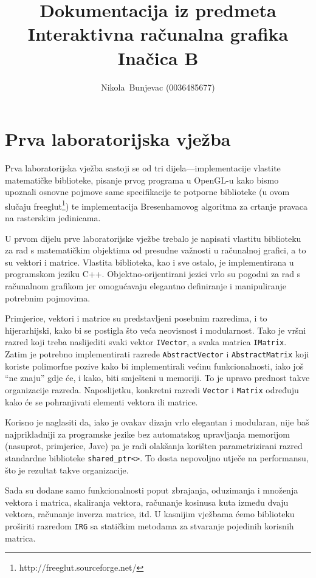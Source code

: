 \documentclass[a4paper,12pt]{article}
\author{Nikola~Bunjevac (0036485677)}
\title{Dokumentacija iz predmeta Interaktivna računalna grafika\\{\normalsize Inačica B}}
\begin{document}
\maketitle

\section{Prva laboratorijska vježba}

Prva laboratorijska vježba sastoji se od tri dijela---implementacije vlastite
matematičke biblioteke, pisanje prvog programa u OpenGL-u kako bismo upoznali
osnovne pojmove same specifikacije te potporne biblioteke (u ovom slučaju freeglut\footnote{http://freeglut.sourceforge.net/}) te implementacija Bresenhamovog algoritma za crtanje pravaca na rasterskim jedinicama.

U prvom dijelu prve laboratorijske vježbe trebalo je napisati vlastitu biblioteku za
rad s matematičkim objektima od presudne važnosti u računalnoj grafici, a to su vektori i matrice. Vlastita biblioteka, kao i sve ostalo, je implementirana u programskom jeziku C++. Objektno-orijentirani jezici vrlo su pogodni za rad
s računalnom grafikom jer omogućavaju elegantno definiranje i manipuliranje
potrebnim pojmovima.

Primjerice, vektori i matrice su predstavljeni posebnim
razredima, i to hijerarhijski, kako bi se postigla što veća neovisnost i
modularnost. Tako je vršni razred koji treba naslijediti svaki vektor {\verb|IVector|}, a svaka matrica {\verb|IMatrix|}. Zatim je potrebno implementirati
razrede {\verb|AbstractVector|} i {\verb|AbstractMatrix|} koji koriste
polimorfne pozive kako bi implementirali većinu funkcionalnosti, iako još
``ne znaju'' gdje će, i kako, biti smješteni u memoriji. To je upravo prednost
takve organizacije razreda. Naposlijetku, konkretni razredi {\verb|Vector|} i
{\verb|Matrix|} određuju kako će se pohranjivati elementi vektora ili matrice.

Korisno je naglasiti da, iako je ovakav dizajn vrlo elegantan i modularan, nije baš najprikladniji za programske jezike bez automatskog upravljanja memorijom (nasuprot, primjerice, Jave) pa je radi olakšanja korišten parametrizirani razred standardne biblioteke {\verb|shared_ptr<>|}.
To dosta nepovoljno utječe na performansu, što je rezultat takve organizacije.

Sada su dodane samo funkcionalnosti poput zbrajanja, oduzimanja i množenja vektora i matrica, skaliranja vektora, računanje kosinusa kuta između dvaju vektora, računanje inverza matrice, itd.
U kasnijim vježbama ćemo biblioteku proširiti razredom {\verb|IRG|} sa
statičkim metodama za stvaranje pojedinih korisnih matrica.
\end{document}
